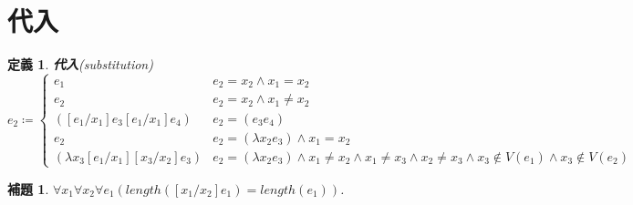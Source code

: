 \documentclass{ltjsbook}%
\newtheorem{lemma}{補題}[section]%
\newtheorem{definition}{定義}[section]%
\newcommand\term[2]{\textbf{#1}{(\textit{#2})}}%
\begin{document}
\section{代入}%
\label{untyped:subst}%
\begin{definition}%
\term{代入}{substitution}%
\begin{equation}%
  [\mathit{e}_1/\mathit{x}_1]\mathit{e}_2 \coloneqq \begin{cases}%
    \mathit{e}_1 & \mathit{e}_2 = \mathit{x}_2\land\mathit{x}_1=\mathit{x}_2\\%
    \mathit{e}_2%
    & \mathit{e}_2 = \mathit{x}_2\land\mathit{x}_1\neq\mathit{x}_2\\%
    ([\mathit{e}_1/\mathit{x}_1]\mathit{e}_3%
      [\mathit{e}_1/\mathit{x}_1]\mathit{e}_4)%
    & \mathit{e}_2 = (\mathit{e}_3\mathit{e}_4)\\%
    \mathit{e}_2%
    & \mathit{e}_2 = (\lambda\mathit{x}_2\mathit{e}_3)%
    \land \mathit{x}_1 = \mathit{x}_2\\%
    (\lambda\mathit{x}_3[\mathit{e}_1/\mathit{x}_1][\mathit{x}_3/\mathit{x}_2]%
    \mathit{e}_3)%
    & \mathit{e}_2 = (\lambda\mathit{x}_2\mathit{e}_3)%
    \land \mathit{x}_1 \neq \mathit{x}_2%
    \land\mathit{x}_1\neq\mathit{x}_3%
    \land\mathit{x}_2\neq\mathit{x}_3%
    \land\mathit{x}_3\not\in V(\mathit{e}_1)%
    \land\mathit{x}_3\not\in V(\mathit{e}_2)%
  \end{cases}%
\end{equation}%
\end{definition}%
\begin{lemma}%
  \label{lemma:subst_len}%
  $\forall\mathit{x}_1\forall\mathit{x}_2\forall\mathit{e}_1%
  (length([\mathit{x}_1/\mathit{x}_2]\mathit{e}_1)=length(\mathit{e}_1))$.%
\end{lemma}%
\end{document}
